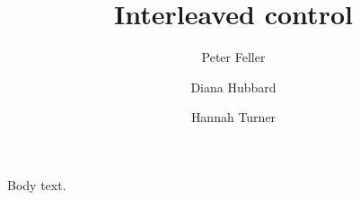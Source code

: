 \documentclass{amsart}
\begin{document}
\title{Interleaved control}
\author{Peter Feller}
\address{ETH Zurich}
\author{Diana Hubbard}
\address{Brooklyn College CUNY}
\author{Hannah Turner}
\address{Georgia Institute of Technology}
\maketitle
Body text.
\end{document}
